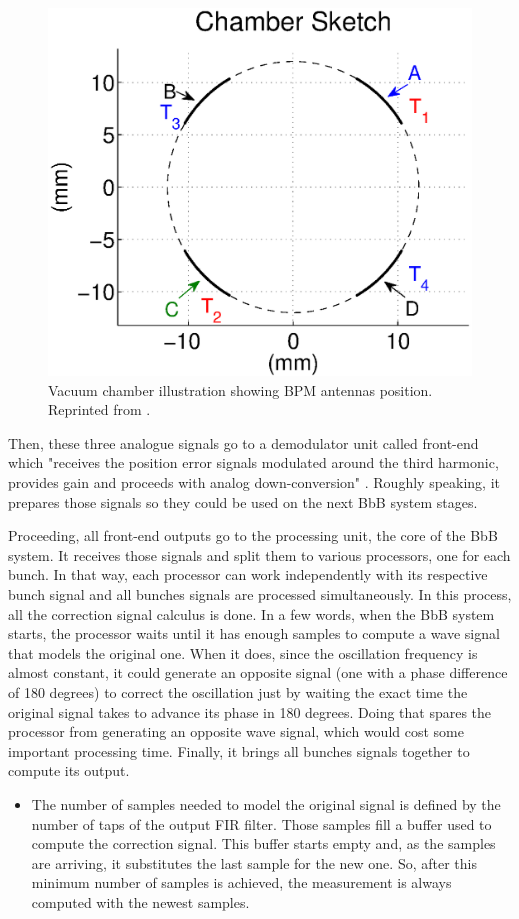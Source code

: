 \begin{figure}[!htb]
	\centering
	\includegraphics[width=0.7\linewidth]{./Figures/BPMsketch.eps}
	\caption{Vacuum chamber illustration showing BPM antennas position. Reprinted from \cite{digBPMCalculation}.}
	\label{fig:BPMsketch}
\end{figure}

Then, these three analogue signals go to a demodulator unit called front-end which "receives the position error signals modulated around the third harmonic, provides gain and proceeds with analog down-conversion" \cite{digBPMCalculation}. Roughly speaking, it prepares those signals so they could be used on the next BbB system stages.

Proceeding, all front-end outputs go to the processing unit, the core of the BbB system. It receives those signals and split them to various processors, one for each bunch. In that way, each processor can work independently with its respective bunch signal and all bunches signals are processed simultaneously. In this process, all the correction signal calculus is done. In a few words, when the BbB system starts, the processor waits until it has enough samples to compute a wave signal that models the original one. When it does, since the oscillation frequency is almost constant, it could generate an opposite signal (one with a phase difference of 180 degrees) to correct the oscillation just by waiting the exact time the original signal takes to advance its phase in 180 degrees. Doing that spares the processor from generating an opposite wave signal, which would cost some important processing time. Finally, it brings all bunches signals together to compute its output.

\begin{itemize}
	\item The number of samples needed to model the original signal is defined by the number of taps of the output FIR filter. Those samples fill a buffer used to compute the correction signal. This buffer starts empty and, as the samples are arriving, it substitutes the last sample for the new one. So, after this minimum number of samples is achieved, the measurement is always computed with the newest samples.
\end{itemize}

